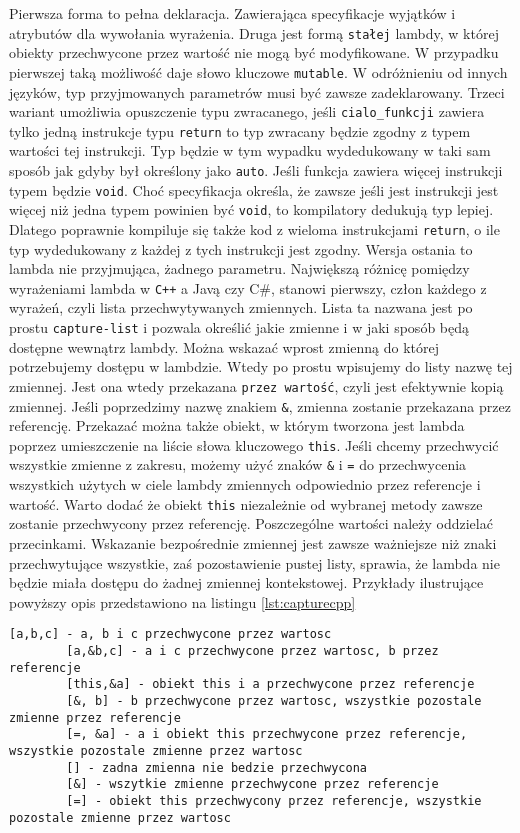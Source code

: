 \documentclass[a4paper,10pt]{report}
\begin{document}
  Pierwsza forma to pełna deklaracja. Zawierająca specyfikacje wyjątków i atrybutów dla wywołania wyrażenia. Druga jest formą \verb|stałej| lambdy, w której obiekty przechwycone przez wartość nie mogą być modyfikowane. W przypadku pierwszej taką możliwość daje słowo kluczowe \verb|mutable|. W odróżnieniu od innych języków, typ przyjmowanych parametrów musi być zawsze zadeklarowany. Trzeci wariant umożliwia opuszczenie typu zwracanego, jeśli \verb|cialo_funkcji| zawiera tylko jedną instrukcje typu \verb|return| to typ zwracany będzie zgodny z typem wartości tej instrukcji. Typ będzie w tym wypadku wydedukowany w taki sam sposób jak gdyby był określony jako \verb|auto|. Jeśli funkcja zawiera więcej instrukcji typem będzie \verb|void|. Choć specyfikacja określa, że zawsze jeśli jest instrukcji jest więcej niż jedna typem powinien być \verb|void|, to kompilatory dedukują typ lepiej. Dlatego poprawnie kompiluje się także kod z wieloma instrukcjami \verb|return|, o ile typ wydedukowany z każdej z tych instrukcji jest zgodny. Wersja ostania to lambda nie przyjmująca, żadnego parametru. Największą różnicę pomiędzy wyrażeniami lambda w \verb|C++| a Javą czy C\#, stanowi pierwszy, człon każdego z wyrażeń, czyli lista przechwytywanych zmiennych. Lista ta nazwana jest po prostu \verb|capture-list| i pozwala określić jakie zmienne i w jaki sposób będą dostępne wewnątrz lambdy. Można wskazać wprost zmienną do której potrzebujemy dostępu w lambdzie. Wtedy po prostu wpisujemy do listy nazwę tej zmiennej. Jest ona wtedy przekazana \verb|przez wartość|, czyli jest efektywnie kopią zmiennej. Jeśli poprzedzimy nazwę znakiem \verb|&|, zmienna zostanie przekazana przez referencję. Przekazać można także obiekt, w którym tworzona jest lambda poprzez umieszczenie na liście słowa kluczowego \verb|this|. Jeśli chcemy przechwycić wszystkie zmienne z zakresu, możemy użyć znaków \verb|&| i \verb|=| do przechwycenia wszystkich użytych w ciele lambdy zmiennych odpowiednio przez referencje i wartość. Warto dodać że obiekt \verb|this| niezależnie od wybranej metody zawsze zostanie przechwycony przez referencję. Poszczególne wartości należy oddzielać przecinkami. Wskazanie bezpośrednie zmiennej jest zawsze ważniejsze niż znaki przechwytujące wszystkie, zaś pozostawienie pustej listy, sprawia, że lambda nie będzie miała dostępu do żadnej zmiennej kontekstowej. Przykłady ilustrujące powyższy opis przedstawiono na listingu \ref{lst:capturecpp}
    \begin{lstlisting}[caption={Listy przechwytywania w języku C++},label={lst:capturecpp}]
		[a,b,c] - a, b i c przechwycone przez wartosc
		[a,&b,c] - a i c przechwycone przez wartosc, b przez referencje
		[this,&a] - obiekt this i a przechwycone przez referencje
		[&, b] - b przechwycone przez wartosc, wszystkie pozostale zmienne przez referencje
		[=, &a] - a i obiekt this przechwycone przez referencje, wszystkie pozostale zmienne przez wartosc
		[] - zadna zmienna nie bedzie przechwycona
		[&] - wszytkie zmienne przechwycone przez referencje
		[=] - obiekt this przechwycony przez referencje, wszystkie pozostale zmienne przez wartosc
    \end{lstlisting}
\end{document}
